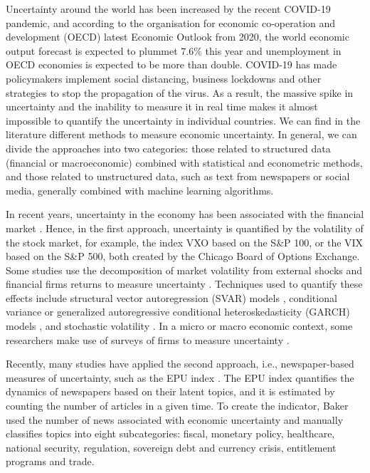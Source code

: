 \documentclass{article}
\begin{document}
Uncertainty around the world has been increased by the recent COVID-19 pandemic, and according to the organisation for economic co-operation and development (OECD) latest Economic Outlook from 2020, the world economic output forecast is expected to plummet $7.6\%$ this year and unemployment in OECD economies is expected to be more than double. COVID-19 has made  policymakers implement social distancing, business lockdowns and other strategies to stop the propagation of the virus. As a result, the massive spike in uncertainty and the inability to measure it in real time makes it almost impossible to quantify the uncertainty in individual countries. We can find in the literature different methods to measure economic uncertainty. In general,  we can divide the approaches into two categories: those related to structured data (financial or macroeconomic)  combined with statistical and econometric methods, and those related to unstructured data, such as text from newspapers or social media, generally combined with machine learning algorithms.

In recent years, uncertainty in the economy has been associated with the financial market \citep{Bloom2009}. Hence, in the first approach,  uncertainty is quantified by the volatility of the stock market, for example, the index VXO  based on the S\&P 100, or the VIX based on the S\&P 500, both created by the Chicago Board of Options Exchange. Some studies use the decomposition of market volatility from external  shocks and financial firms returns to measure uncertainty \citep{cambel2001, bloom2007, Gilch2014, carriero2018, lahir2010}. Techniques used to quantify these effects include  structural vector autoregression (SVAR) models \citep{Gilch2014}, conditional variance or generalized autoregressive conditional heteroskedasticity (GARCH) models \citep{Ferrera2014}, and stochastic volatility  \citep{carriero2018}. In a micro or macro economic context, some researchers make use of surveys of firms to measure uncertainty \citep{Ezgi2017, Jo2015, Rossi2015, Scoti2016, bach2013}.

Recently, many studies have applied the second approach, i.e., newspaper-based measures of uncertainty, such as the EPU index \citep{Baker2016}. The EPU index quantifies the dynamics of newspapers based on their latent topics, and it is estimated by counting the number of articles in a given time. To create the indicator, Baker used the number of news associated with economic uncertainty and manually classifies topics into eight subcategories: fiscal, monetary policy, healthcare, national security, regulation, sovereign debt and currency crisis, entitlement programs and trade.
\end{document}
